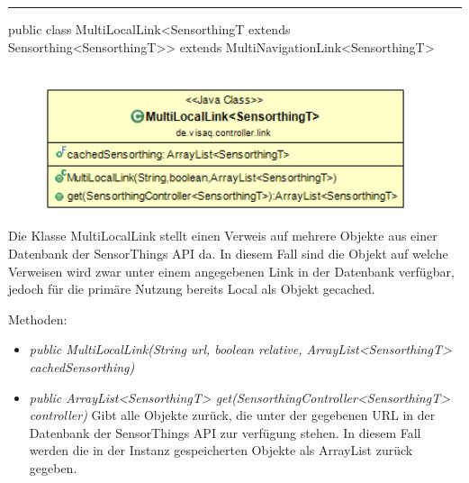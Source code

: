\rule{\textwidth}{0.4pt}
public class MultiLocalLink<SensorthingT extends Sensorthing<SensorthingT>> extends MultiNavigationLink<SensorthingT>
\\\\
\begin{minipage}{0.4\textwidth}
    \begin{figure}[H]
        {\centering\includegraphics[width=0.95\textwidth]{media/backend/controller/classes/MultiLocalLink.png}}
    \end{figure}
    \end{minipage} \hfill
\begin{minipage}{0.6\textwidth}
    Die Klasse MultiLocalLink stellt einen Verweis auf mehrere Objekte aus einer Datenbank der \gls{SensorThings API} da.
    In diesem Fall sind die Objekt auf welche Verweisen wird zwar unter einem angegebenen Link in der Datenbank verfügbar, jedoch für die primäre Nutzung bereits Local als Objekt gecached.
\end{minipage}

Methoden:
\begin{itemize}
    \item \emph{public MultiLocalLink(String url, boolean relative, ArrayList<SensorthingT> cachedSensorthing)}
    \relativeDescription
    \item \emph{public ArrayList<SensorthingT> get(SensorthingController<SensorthingT> controller)}
    Gibt alle Objekte zurück, die unter der gegebenen URL in der Datenbank der \gls{SensorThings API} zur verfügung stehen.
    In diesem Fall werden die in der Instanz gespeicherten Objekte als ArrayList zurück gegeben.
\end{itemize}


